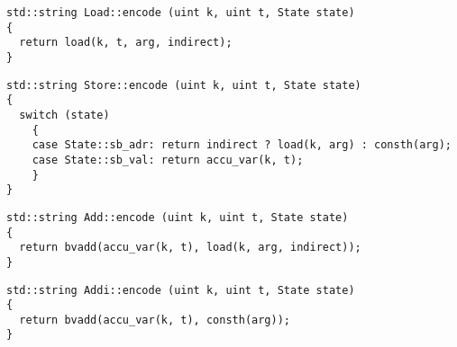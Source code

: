 
\begin{lstlisting}[style=c++,aboveskip=-\encodeskip,belowskip=\encodeskip]
std::string Load::encode (uint k, uint t, State state)
{
  return load(k, t, arg, indirect);
}
\end{lstlisting}


\begin{lstlisting}[style=c++,aboveskip=-\encodeskip,belowskip=\encodeskip]
std::string Store::encode (uint k, uint t, State state)
{
  switch (state)
    {
    case State::sb_adr: return indirect ? load(k, arg) : consth(arg);
    case State::sb_val: return accu_var(k, t);
    }
}
\end{lstlisting}


\begin{lstlisting}[style=c++,aboveskip=-\encodeskip,belowskip=\encodeskip]
std::string Add::encode (uint k, uint t, State state)
{
  return bvadd(accu_var(k, t), load(k, arg, indirect));
}
\end{lstlisting}


\begin{lstlisting}[style=c++,aboveskip=-\encodeskip,belowskip=\encodeskip]
std::string Addi::encode (uint k, uint t, State state)
{
  return bvadd(accu_var(k, t), consth(arg));
}
\end{lstlisting}

